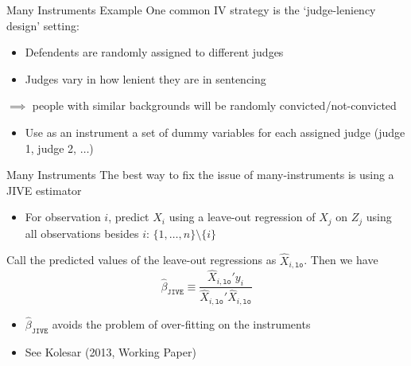 \documentclass[aspectratio=169,t,11pt,table]{beamer}
\begin{document}
\begin{frame}{Many Instruments Example}
  One common IV strategy is the `judge-leniency design' setting:
  \begin{itemize}
    \item Defendents are randomly assigned to different judges
    \item Judges vary in how lenient they are in sentencing
  \end{itemize}

  
  \bigskip
  $\implies$ people with similar backgrounds will be randomly convicted/not-convicted
  \begin{itemize}
    \item Use as an instrument a set of dummy variables for each assigned judge (judge 1, judge 2, $\dots$)
  \end{itemize}
\end{frame}

\begin{frame}{Many Instruments}
  The best way to fix the issue of many-instruments is using a JIVE estimator
  \begin{itemize}
    \item For observation $i$, predict $X_i$ using a leave-out regression of $X_j$ on $Z_j$ using all observations besides $i$: $\{ 1, \dots, n \} \setminus \{ i \}$
  \end{itemize}

  \pause
  \bigskip
  Call the predicted values of the leave-out regressions as $\hat{X}_{i, \texttt{lo}}$. Then we have 
  $$
    \hat{\beta}_{\texttt{JIVE}} \equiv \frac{\hat{X}_{i, \texttt{lo}}' y_i}{\hat{X}_{i, \texttt{lo}}' \hat{X}_{i, \texttt{lo}}}
  $$

  \begin{itemize}
    \item $\hat{\beta}_{\texttt{JIVE}}$ avoids the problem of over-fitting on the instruments 
    
    \item See Kolesar (2013, Working Paper)
  \end{itemize}
\end{frame}
\end{document}
